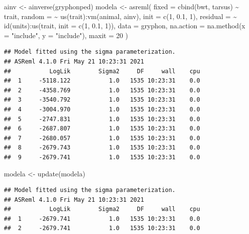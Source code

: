 \documentclass[
  12pt,
]{book}
\newenvironment{Shaded}{\begin{snugshade}}{\end{snugshade}}
\newcommand{\AttributeTok}[1]{\textcolor[rgb]{0.77,0.63,0.00}{#1}}
\newcommand{\DecValTok}[1]{\textcolor[rgb]{0.00,0.00,0.81}{#1}}
\newcommand{\FloatTok}[1]{\textcolor[rgb]{0.00,0.00,0.81}{#1}}
\newcommand{\FunctionTok}[1]{\textcolor[rgb]{0.00,0.00,0.00}{#1}}
\newcommand{\NormalTok}[1]{#1}
\newcommand{\OtherTok}[1]{\textcolor[rgb]{0.56,0.35,0.01}{#1}}
\newcommand{\SpecialCharTok}[1]{\textcolor[rgb]{0.00,0.00,0.00}{#1}}
\newcommand{\StringTok}[1]{\textcolor[rgb]{0.31,0.60,0.02}{#1}}
\begin{document}
\begin{Shaded}
\begin{Highlighting}[]
\NormalTok{ainv }\OtherTok{\textless{}{-}} \FunctionTok{ainverse}\NormalTok{(gryphonped)}
\NormalTok{modela }\OtherTok{\textless{}{-}} \FunctionTok{asreml}\NormalTok{(}
  \AttributeTok{fixed =} \FunctionTok{cbind}\NormalTok{(bwt, tarsus) }\SpecialCharTok{\textasciitilde{}}\NormalTok{ trait,}
  \AttributeTok{random =} \SpecialCharTok{\textasciitilde{}} \FunctionTok{us}\NormalTok{(trait)}\SpecialCharTok{:}\FunctionTok{vm}\NormalTok{(animal, ainv), }\AttributeTok{init =} \FunctionTok{c}\NormalTok{(}\DecValTok{1}\NormalTok{, }\FloatTok{0.1}\NormalTok{, }\DecValTok{1}\NormalTok{),}
  \AttributeTok{residual =} \SpecialCharTok{\textasciitilde{}} \FunctionTok{id}\NormalTok{(units)}\SpecialCharTok{:}\FunctionTok{us}\NormalTok{(trait, }\AttributeTok{init =} \FunctionTok{c}\NormalTok{(}\DecValTok{1}\NormalTok{, }\FloatTok{0.1}\NormalTok{, }\DecValTok{1}\NormalTok{)),}
  \AttributeTok{data =}\NormalTok{ gryphon,}
  \AttributeTok{na.action =} \FunctionTok{na.method}\NormalTok{(}\AttributeTok{x =} \StringTok{"include"}\NormalTok{, }\AttributeTok{y =} \StringTok{"include"}\NormalTok{),}
  \AttributeTok{maxit =} \DecValTok{20}
\NormalTok{)}
\end{Highlighting}
\end{Shaded}

\begin{verbatim}
## Model fitted using the sigma parameterization.
## ASReml 4.1.0 Fri May 21 10:23:31 2021
##           LogLik        Sigma2     DF     wall    cpu
##  1     -5118.122           1.0   1535 10:23:31    0.0
##  2     -4358.769           1.0   1535 10:23:31    0.0
##  3     -3540.792           1.0   1535 10:23:31    0.0
##  4     -3004.970           1.0   1535 10:23:31    0.0
##  5     -2747.831           1.0   1535 10:23:31    0.0
##  6     -2687.807           1.0   1535 10:23:31    0.0
##  7     -2680.057           1.0   1535 10:23:31    0.0
##  8     -2679.743           1.0   1535 10:23:31    0.0
##  9     -2679.741           1.0   1535 10:23:31    0.0
\end{verbatim}

\begin{Shaded}
\begin{Highlighting}[]
\NormalTok{modela }\OtherTok{\textless{}{-}} \FunctionTok{update}\NormalTok{(modela)}
\end{Highlighting}
\end{Shaded}

\begin{verbatim}
## Model fitted using the sigma parameterization.
## ASReml 4.1.0 Fri May 21 10:23:31 2021
##           LogLik        Sigma2     DF     wall    cpu
##  1     -2679.741           1.0   1535 10:23:31    0.0
##  2     -2679.741           1.0   1535 10:23:31    0.0
\end{verbatim}
\end{document}
